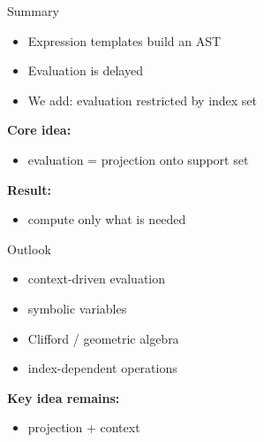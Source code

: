 \documentclass{beamer}
\begin{document}

\begin{frame}{Summary}

\begin{itemize}
\item Expression templates build an AST
\item Evaluation is delayed
\item We add: evaluation restricted by index set
\end{itemize}

\vspace{1em}

\textbf{Core idea:}

\begin{itemize}
\item evaluation = projection onto support set
\end{itemize}

\vspace{1em}

\textbf{Result:}

\begin{itemize}
\item compute only what is needed
\end{itemize}

\end{frame}


\begin{frame}{Outlook}

\begin{itemize}
\item context-driven evaluation
\item symbolic variables
\item Clifford / geometric algebra
\item index-dependent operations
\end{itemize}

\vspace{1em}

\textbf{Key idea remains:}

\begin{itemize}
\item projection + context
\end{itemize}

\end{frame}
\end{document}
